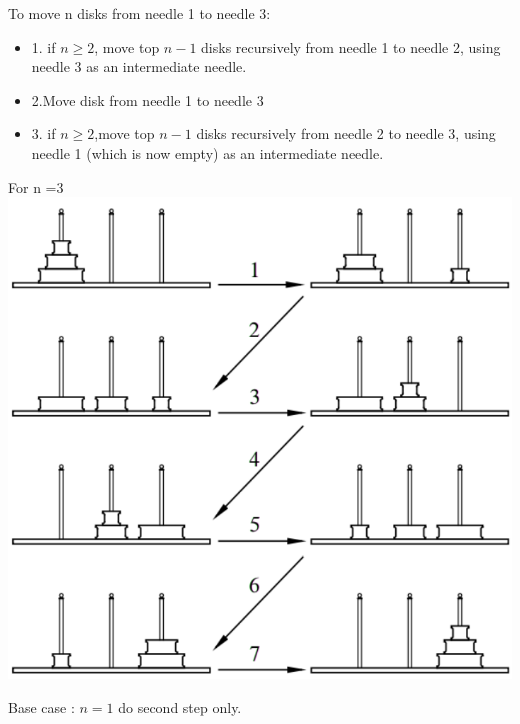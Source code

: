 \documentclass[12pt,oneside]{book}
\begin{document}
\begin{minipage}{0.6\linewidth}
	To move n disks from needle 1 to needle 3:
	\begin{itemize}
		\item 1. if $n\geq 2$, move top $n-1$ disks recursively from needle 1 to needle 2, using needle 3 as an intermediate needle.
		\item 2.Move disk from needle 1 to needle 3
		\item 3. if $n\geq 2$,move top $n-1$ disks recursively from needle 2 to needle 3, using needle 1 (which is now empty) as an intermediate needle.
	\end{itemize}
\end{minipage}
\begin{minipage}{0.4\linewidth}
	For n =3\\
	\includegraphics[width=\linewidth]{../pic/python/12}
\end{minipage}
Base case : $n=1$ do second step only.\\
\end{document}
